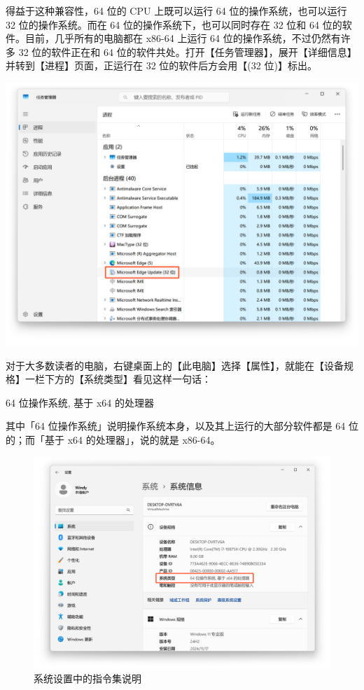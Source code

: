 \begin{note}
  得益于这种兼容性，64 位的 CPU 上既可以运行 64 位的操作系统，也可以运行 32 位的操作系统。而在 64 位的操作系统下，也可以同时存在 32 位和 64 位的软件。目前，几乎所有的电脑都在 x86-64 上运行 64 位的操作系统，不过仍然有许多 32 位的软件正在和 64 位的软件共处。打开【任务管理器】，展开【详细信息】并转到【进程】页面，正运行在 32 位的软件后方会用【(32 位)】标出。

  \begin{center}
    \includegraphics[width=.65\textwidth]{assets/surpass/32bit_in_taskmgr.png}
    \label{fig:32bit_in_taskmgr}
  \end{center}
\end{note}

对于大多数读者的电脑，右键桌面上的【此电脑】选择【属性】，就能在【设备规格】一栏下方的【系统类型】看见这样一句话：
\begin{quoting}
  64 位操作系统, 基于 x64 的处理器
\end{quoting}
其中「64 位操作系统」说明操作系统本身，以及其上运行的大部分软件都是 64 位的；而「基于 x64 的处理器」，说的就是 x86-64。

\begin{figure}[htb!]
  \centering
  \includegraphics[width=.6\textwidth]{assets/surpass/x64_in_settings.png}
  \caption{系统设置中的指令集说明}
  \label{fig:x64_in_settings}
\end{figure}


